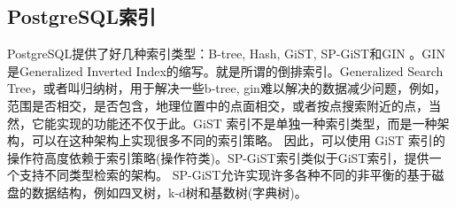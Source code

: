 \documentclass[../../../interview-questions.tex]{subfiles}
\begin{document}
\subsection{PostgreSQL索引}

PostgreSQL提供了好几种索引类型：B-tree, Hash, GiST, SP-GiST和GIN 。GIN是Generalized Inverted Index的缩写。就是所谓的倒排索引。Generalized Search Tree，或者叫归纳树，用于解决一些b-tree, gin难以解决的数据减少问题，例如，范围是否相交，是否包含，地理位置中的点面相交，或者按点搜索附近的点，当然，它能实现的功能还不仅于此。GiST 索引不是单独一种索引类型，而是一种架构，可以在这种架构上实现很多不同的索引策略。 因此，可以使用 GiST 索引的操作符高度依赖于索引策略(操作符类)。SP-GiST索引类似于GiST索引，提供一个支持不同类型检索的架构。 SP-GiST允许实现许多各种不同的非平衡的基于磁盘的数据结构，例如四叉树，k-d树和基数树(字典树)。
\end{document}
